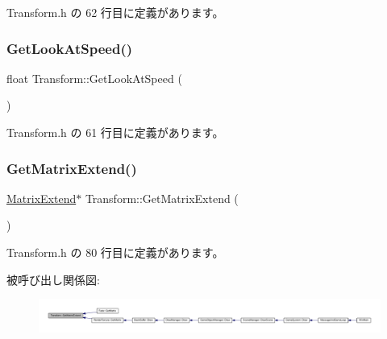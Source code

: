  Transform.\+h の 62 行目に定義があります。

\mbox{\label{class_transform_a79fdb2cb4eb1e4abf48e0f9fd74707ba}} 
\subsubsection{\texorpdfstring{Get\+Look\+At\+Speed()}{GetLookAtSpeed()}}
{\footnotesize\ttfamily float Transform\+::\+Get\+Look\+At\+Speed (\begin{DoxyParamCaption}{ }\end{DoxyParamCaption})\hspace{0.3cm}{\ttfamily [inline]}}



 Transform.\+h の 61 行目に定義があります。

\mbox{\label{class_transform_ab1101d4467d772f3ddc0558586e39c79}} 
\subsubsection{\texorpdfstring{Get\+Matrix\+Extend()}{GetMatrixExtend()}}
{\footnotesize\ttfamily \mbox{\hyperlink{class_matrix_extend}{Matrix\+Extend}}$\ast$ Transform\+::\+Get\+Matrix\+Extend (\begin{DoxyParamCaption}{ }\end{DoxyParamCaption})\hspace{0.3cm}{\ttfamily [inline]}}



 Transform.\+h の 80 行目に定義があります。

被呼び出し関係図\+:
\nopagebreak
\begin{figure}[H]
\begin{center}
\leavevmode
\includegraphics[width=350pt]{class_transform_ab1101d4467d772f3ddc0558586e39c79_icgraph}
\end{center}
\end{figure}
\mbox{\label{class_transform_addff6461a77b9f5c5249e46deb5c2c19}} 
